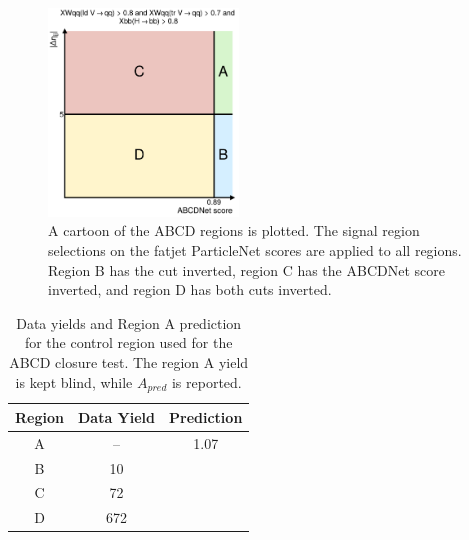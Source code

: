 \begin{figure}[htb]
    \centering
    \includegraphics[width=0.45\textwidth]{fig/vbsvvh/ABCD_abcdnet_score_gt_0p89_vs_abs_deta_jj_gt_5p0.pdf}
    \caption{
        A cartoon of the ABCD regions is plotted. 
        The signal region selections on the fatjet ParticleNet scores are applied to all regions. 
        Region B has the \detajj cut inverted, region C has the ABCDNet score inverted, and region D has both cuts inverted. 
    }
    \label{fig:vbsvvh_abcd}
\end{figure}

\begin{table}[htbp]
    \centering
    \caption[VBS $\VVH$ ABCD yields]{
        Data yields and Region A prediction for the control region used for the ABCD closure test. 
        The region A yield is kept blind, while $A_{pred}$ is reported.
    }
    \begin{tabular}{ccc}
    \toprule
    \textbf{Region} & Data Yield & Prediction \\
    \midrule
    A               & --         & 1.07       \\
    B               & 10         &            \\
    C               & 72         &            \\
    D               & 672        &            \\
    \bottomrule
    \end{tabular}
    \label{tab:0lepABCDregion}

\end{table}


